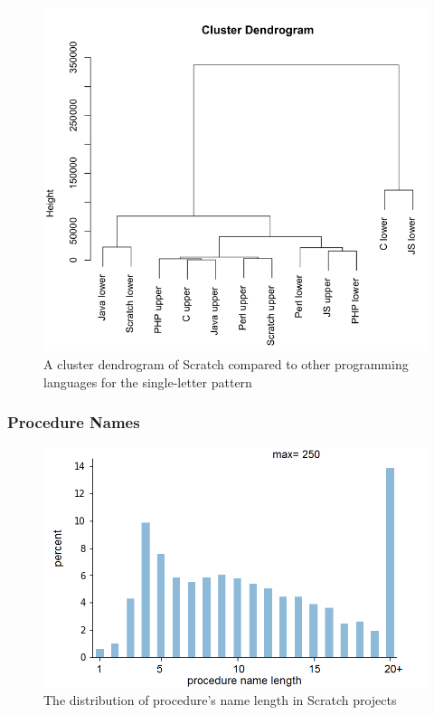 \documentclass[conference]{IEEEtran}
\begin{document}
\begin{figure}[tb]
	\begin{center}
		\includegraphics[width=\columnwidth]{fig/cluster_single_letter}
		\caption{A cluster dendrogram of Scratch compared to other programming languages for the single-letter pattern}
		\label{fig:similarity_single_letter}
	\end{center}
\end{figure} 


\subsubsection {Procedure Names}
\label{res:proc}
\begin{figure}[h]
	\begin{center}
		\includegraphics[scale=0.28]{fig/project/distribution_proc_name_length}
		\caption{The distribution of procedure's name length in Scratch projects}
		\label{fig:distribution_of_lengths_func}
	\end{center}
\end{figure} 
\end{document}
